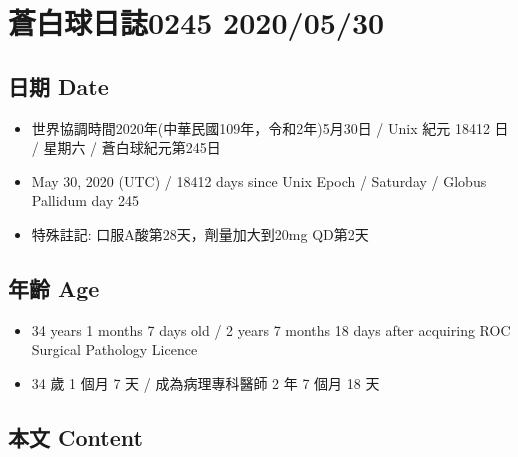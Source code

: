 \documentclass[a5paper, 12pt
]{book}
\providecommand{\tightlist}{%
  \setlength{\itemsep}{0pt}\setlength{\parskip}{0pt}}
\begin{document}
\hypertarget{ux84bcux767dux7403ux65e5ux8a8c0245-20200530}{%
\section{蒼白球日誌0245
2020/05/30}\label{ux84bcux767dux7403ux65e5ux8a8c0245-20200530}}

\hypertarget{ux65e5ux671f-date-90}{%
\subsection{日期 Date}\label{ux65e5ux671f-date-90}}

\begin{itemize}
\tightlist
\item
  世界協調時間2020年(中華民國109年，令和2年)5月30日 / Unix 紀元 18412 日
  / 星期六 / 蒼白球紀元第245日
\item
  May 30, 2020 (UTC) / 18412 days since Unix Epoch / Saturday / Globus
  Pallidum day 245
\item
  特殊註記: 口服A酸第28天，劑量加大到20mg QD第2天
\end{itemize}

\hypertarget{ux5e74ux9f61-age-90}{%
\subsection{年齡 Age}\label{ux5e74ux9f61-age-90}}

\begin{itemize}
\tightlist
\item
  34 years 1 months 7 days old / 2 years 7 months 18 days after
  acquiring ROC Surgical Pathology Licence
\item
  34 歲 1 個月 7 天 / 成為病理專科醫師 2 年 7 個月 18 天
\end{itemize}

\hypertarget{ux672cux6587-content-90}{%
\subsection{本文 Content}\label{ux672cux6587-content-90}}
\end{document}

